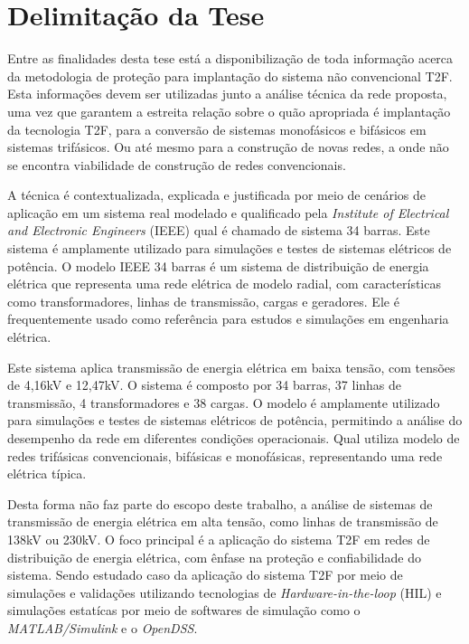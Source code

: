 \documentclass[oneside,openright,12pt]{ufsm_2021} %
\begin{document}
\section{Delimitação da Tese}

\par Entre as finalidades desta tese está a disponibilização de toda informação acerca da metodologia de proteção para implantação do sistema não convencional T2F. Esta informações devem ser utilizadas junto a análise técnica da rede proposta, uma vez que garantem a estreita relação sobre o quão apropriada é implantação da tecnologia T2F, para a conversão de sistemas monofásicos e bifásicos em sistemas trifásicos. Ou até mesmo para a construção de novas redes, a onde não se encontra viabilidade de construção de redes convencionais.

\par A técnica é contextualizada, explicada e justificada por meio de cenários de aplicação em um sistema real modelado e qualificado pela \textit{Institute of Electrical and Electronic Engineers} (IEEE) qual é chamado de sistema 34 barras. Este sistema é amplamente utilizado para simulações e testes de sistemas elétricos de potência. O modelo IEEE 34 barras é um sistema de distribuição de energia elétrica que representa uma rede elétrica de modelo radial, com características como transformadores, linhas de transmissão, cargas e geradores. Ele é frequentemente usado como referência para estudos e simulações em engenharia elétrica.

\par Este sistema aplica transmissão de energia elétrica em baixa tensão, com tensões de 4,16kV e 12,47kV. O sistema é composto por 34 barras, 37 linhas de transmissão, 4 transformadores e 38 cargas. O modelo é amplamente utilizado para simulações e testes de sistemas elétricos de potência, permitindo a análise do desempenho da rede em diferentes condições operacionais. Qual utiliza modelo de redes trifásicas convencionais, bifásicas e monofásicas, representando uma rede elétrica típica. 

\par Desta forma não faz parte do escopo deste trabalho, a análise de sistemas de transmissão de energia elétrica em alta tensão, como linhas de transmissão de 138kV ou 230kV. O foco principal é a aplicação do sistema T2F em redes de distribuição de energia elétrica, com ênfase na proteção e confiabilidade do sistema. Sendo estudado caso da aplicação do sistema T2F por meio de simulações e validações utilizando tecnologias de \textit{Hardware-in-the-loop} (HIL) e simulações estatícas por meio de softwares de simulação como o \textit{MATLAB/Simulink} e o \textit{OpenDSS}. 
\end{document}
